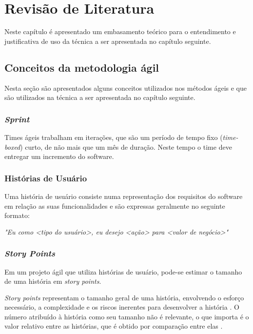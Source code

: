 \chapter{Revisão de Literatura}

Neste capítulo é apresentado um embasamento teórico para o entendimento e justificativa de uso da técnica a ser apresentada no capítulo seguinte.

\section{Conceitos da metodologia ágil}
  Nesta seção são apresentados alguns conceitos utilizados nos métodos ágeis e que são utilizados na técnica a ser apresentada no capítulo seguinte.

  \subsection{\textit{Sprint}}

    Times ágeis trabalham em iterações, que são um período de tempo fixo (\textit{time-boxed}) curto, de não mais que um mês de duração. Neste tempo o time deve entregar um incremento do software. \cite{cohn06} \cite{scrum13}

  \subsection{Histórias de Usuário}

    Uma história de usuário consiste numa representação dos requisitos do software em relação as suas funcionalidades e são 
    expressas geralmente no seguinte formato: \cite{cohn06}

    \begin{centering}
        
        \textit{"Eu como <tipo do usuário>, eu desejo <ação> para <valor de negócio>"}
    
    \end{centering}

  \subsection{\textit{Story Points}}
  
    Em um projeto ágil que utiliza histórias de usuário, pode-se estimar o tamanho de uma história em \textit{story points}.

    \textit{Story points} representam o tamanho geral de uma história, envolvendo o esforço necessário, a complexidade e os
    riscos inerentes para desenvolver a história \cite{cohn06}. O número atribuído à história como seu tamanho não é relevante,
    o que importa é o valor relativo entre as histórias, que é obtido por comparação entre elas \cite{cohn06}.


